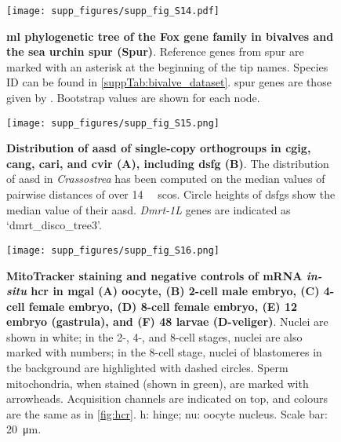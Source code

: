 \begin{figure}[ht]
	\centering
	\texttt{[image: supp\_figures/supp\_fig\_S14.pdf]}
	\caption[\textbf{\gls{ml} phylogenetic tree of the Fox gene family in bivalves and the sea urchin \gls{spur} (Spur)}]
	{
		\textbf{\gls{ml} phylogenetic tree of the Fox gene family in bivalves and the sea urchin \gls{spur} (Spur)}. Reference genes from \gls{spur} are marked with an asterisk at the beginning of the tip names. Species ID can be found in \cref{suppTab:bivalve_dataset}. \gls{spur} genes are those given by . Bootstrap values are shown for each node.
	}
	\label{suppFig:fox_spur}
\end{figure}

\begin{figure}[ht]
	\centering
	\texttt{[image: supp\_figures/supp\_fig\_S15.png]}
	\caption[\textbf{Distribution of \gls{aasd} of single-copy orthogroups in \gls{cgig}, \gls{cang}, \gls{cari}, and \gls{cvir} (A), including \gls{dsfg} (B)}]
	{
		\textbf{Distribution of \gls{aasd} of single-copy orthogroups in \gls{cgig}, \gls{cang}, \gls{cari}, and \gls{cvir} (A), including \gls{dsfg} (B)}. The distribution of \gls{aasd} in \textit{Crassostrea} has been computed on the median values of pairwise distances of over \qty{14}{\kilo\nothing} \glspl{sco}. Circle heights of \glspl{dsfg} show the median value of their \gls{aasd}. \textit{Dmrt-1L} genes are indicated as ‘dmrt\_disco\_tree3’.
	}
	\label{suppFig:DSFG_crassostreaDivergence}
\end{figure}

\begin{figure}[ht!]
	\centering
	\texttt{[image: supp\_figures/supp\_fig\_S16.png]}
	\caption[\textbf{MitoTracker staining and negative controls of mRNA \textit{in-situ} \gls{hcr} in in \gls{mgal} (A) oocyte, (B) 2-cell male embryo, (C) 4-cell female embryo, (D) 8-cell female embryo, (E) \qty{12}{\hpf} embryo (gastrula), and (F) \qty{48}{\hpf} larvae (D-veliger)}]
	{
		\textbf{MitoTracker staining and negative controls of mRNA \textit{in-situ} \gls{hcr} in \gls{mgal} (A) oocyte, (B) 2-cell male embryo, (C) 4-cell female embryo, (D) 8-cell female embryo, (E) \qty{12}{\hpf} embryo (gastrula), and (F) \qty{48}{\hpf} larvae (D-veliger)}. Nuclei are shown in white; in the 2-, 4-, and 8-cell stages, nuclei are also marked with numbers; in the 8-cell stage, nuclei of blastomeres in the background are highlighted with dashed circles. Sperm mitochondria, when stained (shown in green), are marked with arrowheads. Acquisition channels are indicated on top, and colours are the same as in \cref{fig:hcr}. h: hinge; nu: oocyte nucleus. Scale bar: \qty{20}{\um}.
	}
	\label{suppFig:hcrBianco}
\end{figure}

